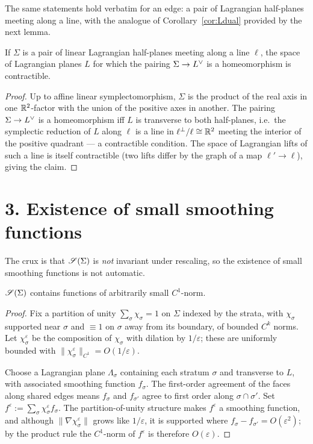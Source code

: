 \documentclass[11pt]{article}
\begin{document}
\noindent The same statements hold verbatim for an edge: a pair of Lagrangian
half-planes meeting along a line, with the analogue of
Corollary~\ref{cor:Ldual} provided by the next lemma.

\begin{qeightlemma}\label{lem:edge}
If $\Sigma$ is a pair of linear Lagrangian half-planes meeting along a line
$\ell$, the space of Lagrangian planes $L$ for which the pairing
$\Sigma\to L^{\vee}$ is a homeomorphism is contractible.
\end{qeightlemma}

\begin{proof}
Up to affine linear symplectomorphism, $\Sigma$ is the product of the real axis
in one $\mathbb{R}^2$-factor with the union of the positive axes in another. The pairing
$\Sigma\to L^{\vee}$ is a homeomorphism iff $L$ is transverse to both half-planes,
i.e.\ the symplectic reduction of $L$ along $\ell$ is a line in $\ell^\perp/\ell\cong\mathbb{R}^2$
meeting the interior of the positive quadrant — a contractible condition. The
space of Lagrangian lifts of such a line is itself contractible (two lifts differ
by the graph of a map $\ell'\to\ell$), giving the claim.
\end{proof}

\section*{3. Existence of small smoothing functions}

The crux is that $\mathscr S(\Sigma)$ is \emph{not} invariant under rescaling, so the
existence of small smoothing functions is not automatic.

\begin{qeightlemma}\label{lem:small}
$\mathscr S(\Sigma)$ contains functions of arbitrarily small $C^1$-norm.
\end{qeightlemma}

\begin{proof}
Fix a partition of unity $\sum_\sigma \chi_\sigma=1$ on $\Sigma$ indexed by the
strata, with $\chi_\sigma$ supported near $\sigma$ and $\equiv1$ on $\sigma$ away
from its boundary, of bounded $C^k$ norms. Let $\chi_\sigma^\varepsilon$ be the
composition of $\chi_\sigma$ with dilation by $1/\varepsilon$; these are
uniformly bounded with $\|\chi_\sigma^\varepsilon\|_{C^1}=O(1/\varepsilon)$.

Choose a Lagrangian plane $\Lambda_\sigma$ containing each stratum $\sigma$ and
transverse to $L$, with associated smoothing function $f_\sigma$. The first-order
agreement of the faces along shared edges means $f_\sigma$ and $f_{\sigma'}$ agree
to first order along $\sigma\cap\sigma'$. Set $f^\varepsilon:=\sum_\sigma
\chi_\sigma^\varepsilon f_\sigma$. The partition-of-unity structure makes
$f^\varepsilon$ a smoothing function, and although $\|\nabla\chi_\sigma^\varepsilon\|$
grows like $1/\varepsilon$, it is supported where $f_\sigma-f_{\sigma'}=O(\varepsilon^2)$;
by the product rule the $C^1$-norm of $f^\varepsilon$ is therefore $O(\varepsilon)$.
\end{proof}
\end{document}
